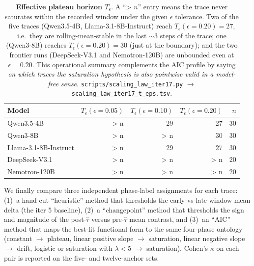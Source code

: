 \documentclass{article}
\providecommand{\eps}{\ensuremath{\epsilon}}
\begin{document}
\begin{table}[t]
  \centering
  \small
  \begin{tabular}{lrrrr}
    \toprule
    Model & $T_\eps(\eps = 0.05)$ & $T_\eps(\eps = 0.10)$ &
           $T_\eps(\eps = 0.20)$ & $n$ \\
    \midrule
    Qwen3.5-4B            & \textgreater{} n & 29 & 27 & 30 \\
    Qwen3-8B              & \textgreater{} n & \textgreater{} n & 30 & 30 \\
    Llama-3.1-8B-Instruct & \textgreater{} n & 29 & 27 & 30 \\
    DeepSeek-V3.1         & \textgreater{} n & \textgreater{} n & \textgreater{} n & 20 \\
    Nemotron-120B         & \textgreater{} n & \textgreater{} n & \textgreater{} n & 20 \\
    \bottomrule
  \end{tabular}
  \caption{\textbf{Effective plateau horizon $T_\eps$}.  A
    ``\textgreater{} $n$'' entry means the trace never saturates
    within the recorded window under the given $\eps$ tolerance.
    Two of the five traces (Qwen3.5-4B, Llama-3.1-8B-Instruct)
    reach $T_\eps(\eps = 0.20) = 27$, i.e.\ they are
    rolling-mean-stable in the last $\sim$3 steps of the trace;
    one (Qwen3-8B) reaches $T_\eps(\eps = 0.20) = 30$ (just at
    the boundary); and the two frontier runs (DeepSeek-V3.1 and
    Nemotron-120B) are unbounded even at $\eps = 0.20$.  This
    operational summary complements the AIC profile by saying
    \emph{on which traces the saturation hypothesis is also
    pointwise valid in a model-free sense}.
    \texttt{scripts/scaling\_law\_iter17.py} $\to$
    \texttt{scaling\_law\_iter17\_t\_eps.tsv}.}
  \label{tab:scaling-iter17-teps}
\end{table}

We finally compare three independent phase-label assignments for
each trace: (1)~a hand-cut ``heuristic'' method that thresholds
the early-vs-late-window mean delta (the iter 5 baseline),
(2)~a ``changepoint'' method that thresholds the sign and
magnitude of the post-$\hat\tau$ versus pre-$\hat\tau$ mean
contrast, and (3)~an ``AIC'' method that maps the best-fit
functional form to the same four-phase ontology (constant $\to$
plateau, linear positive slope $\to$ saturation, linear
negative slope $\to$ drift, logistic or saturation with
$\lambda < 5$ $\to$ saturation).  Cohen's $\kappa$ on each
pair is reported on the five- and twelve-anchor sets.
\end{document}

